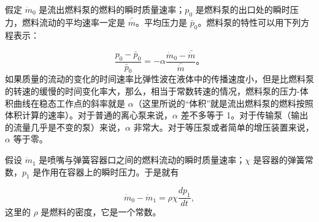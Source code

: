 假定 $ \dot{m}_0 $ 是流出燃料泵的燃料的瞬时质量速率；$ p_0 $ 是燃料泵的出口处的瞬时压力，燃料流动的平均速率一定是 $ \bar{\dot{m}} $。平均压力是 $ \bar{p}_0 $。燃料泵的特性可以用下列方程表示：

\begin{equation}
\label{eq:ch8_pump_characteristic}
\frac{p_0 - \bar{p}_0}{\bar{p}_0} = -\alpha \frac{\dot{m}_0 - \bar{\dot{m}}}{\bar{\dot{m}}}。
\end{equation}
如果质量的流动的变化的时间速率比弹性波在液体中的传播速度小，但是比燃料泵的转速的缓慢的时间变化率大，那么，相当于常数转速的情况，燃料泵的压力-体积曲线在稳态工作点的斜率就是 $ \alpha $（这里所说的“体积”就是流出燃料泵的燃料按照体积计算的速率）。对于普通的离心泵来说，$ \alpha $ 差不多等于 1。对于传输泵（输出的流量几乎是不变的泵）来说，$ \alpha $ 非常大。对于等压泵或者简单的增压装置来说，$ \alpha $ 等于零。

假设 $ \dot{m}_1 $ 是喷嘴与弹簧容器口之间的燃料流动的瞬时质量速率；$ \chi $ 是容器的弹簧常数，$ p_1 $ 是作用在容器上的瞬时压力。于是就有

\begin{equation}\label{eq:ch8_spring_container}
\dot{m}_0 - \dot{m}_1 = \rho \chi \frac{dp_1}{dt},
\end{equation}
这里的 $ \rho $ 是燃料的密度，它是一个常数。


